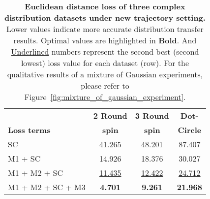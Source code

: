\begin{table}[!ht] 
\centering
\caption{
\textbf{Euclidean distance loss of three complex distribution datasets under new trajectory setting.} Lower values indicate more accurate distribution transfer results. Optimal values are highlighted in \textbf{Bold}. And \underline{Underlined} numbers represent the second best (second lowest) loss value for each dataset (row). 
For the qualitative results of a mixture of Gaussian experiments, please refer to Figure~\ref{fig:mixture_of_gaussian_experiment}.
}
\label{tab:euclidean_distance_complex_datasets_new}
\begin{tabular}{l|c|c|c}
\toprule
& \textbf{2 Round} & \textbf{3 Round} & \textbf{Dot-} \\
\textbf{Loss terms}  & \textbf{spin} & \textbf{spin} & \textbf{Circle} \\
\midrule
SC              & 41.265 & 48.201 & 87.407 \\
M1 + SC          & 14.926 & 18.376 & 30.027 \\
M1 + M2 + SC      & \underline{11.435} & \underline{12.422} & \underline{24.712} \\
M1 + M2 + SC + M3		& \textbf{4.701} & \textbf{9.261} & \textbf{21.968} \\
\bottomrule
\end{tabular}
\end{table}

